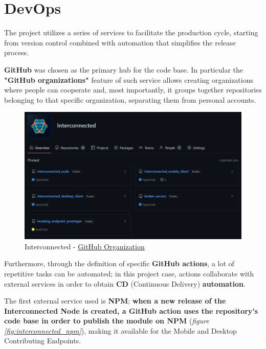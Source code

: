 \section{DevOps}\label{devops}
The project utilizes a series of services to facilitate the production cycle, starting from version control combined with automation that simplifies the release process.

\textbf{GitHub} was chosen as the primary hub for the code base. In particular the \textbf{"GitHub organizations"} feature of such service allows creating organizations where people can cooperate and, most importantly, it groups together repositories belonging to that specific organization, separating them from personal accounts.

\begin{figure}[!ht]
    \centering
    \includegraphics[width=\linewidth]{document/chapters/chapter_7/images/interconnected_organization.png}
    \caption{Interconnected - \href{https://github.com/Interconnected-project}{GitHub Organization}}
    \label{fig:interconnected_organization}
\end{figure}

Furthermore, through the definition of specific \textbf{GitHub actions}, a lot of repetitive tasks can be automated; in this project case, actions collaborate with external services in order to obtain \textbf{CD} (Continuous Delivery) \textbf{automation}.

The first external service used is \textbf{NPM}; \textbf{when a new release of the Interconnected Node is created, a GitHub action uses the repository's code base in order to publish the module on NPM} (\textit{figure \ref{fig:interconnected_npm}}), making it available for the Mobile and Desktop Contributing Endpoints.

